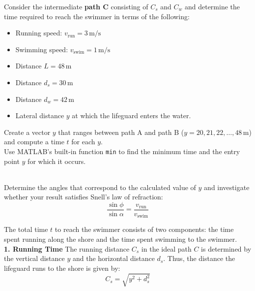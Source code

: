 \documentclass[a4paper, 12pt]{report}
\def\ni{blue!20!white}
\begin{document}
\begin{tcolorbox}[title={\color{black}{\section{Q7}}}, colback=white, colframe=\ni, boxrule=1mm, width=1\textwidth]
         \vspace{0.6em}
             
         Consider the intermediate \textbf{path C} consisting of $C_s$ and $C_w$ and determine the time required to reach the swimmer in terms of the following:\\[1em]
         \begin{minipage}{0.4\textwidth}
         \begin{itemize}[itemsep=-0.1cm]
             \item Running speed: \( v_{\text{run}} = 3 \, \text{m/s} \)
             \item Swimming speed: \( v_{\text{swim}} = 1 \, \text{m/s} \)
             \item Distance \( L = 48 \, \text{m} \)
             \item Distance \( d_s = 30 \, \text{m} \)
             \item Distance \( d_w = 42 \, \text{m} \)
             \item Lateral distance \( y \) at which the lifeguard enters the water.
         \end{itemize}
        \end{minipage}\hfil
        \begin{minipage}{0.52\textwidth}
         Create a vector \( y \) that ranges between path A and path B (\( y = 20, 21, 22, \dots, 48 \, \text{m} \)) and compute a time \( t \) for each \( y \).\\[8pt]
         Use MATLAB's built-in function \texttt{min} to find the minimum time and the entry point \( y \) for which it occurs.
        \end{minipage}\\[1em]
        
         Determine the angles that correspond to the calculated value of \( y \) and investigate 
         whether your result satisfies Snell's law of refraction:
         \[\frac{\sin \phi}{\sin \alpha} = \frac{v_{\text{run}}}{v_{\text{swim}}}\]
    \end{tcolorbox}
    The total time \( t \) to reach the swimmer consists of two components: the time spent running along the shore and the time spent swimming to the swimmer.\\[8pt]
    \textbf{1. Running Time} The running distance \( C_s \) in the ideal path \( C \) is determined by the vertical distance \( y \) and the horizontal distance \( d_s \). Thus, the distance the lifeguard runs to the shore is given by:
    \[ C_s = \sqrt{y^2 + d_s^2} \]
\end{document}
